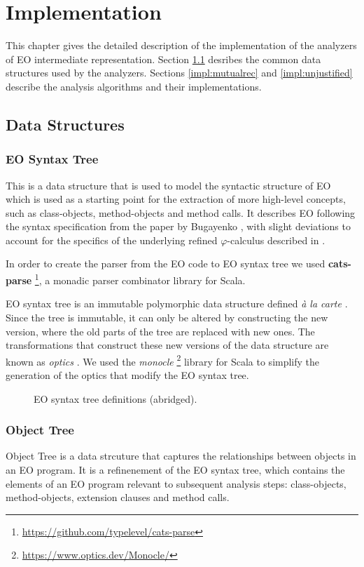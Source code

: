 \chapter{Implementation}
\label{chap:impl}
This chapter gives the detailed description of the implementation of the analyzers of EO intermediate representation. Section \ref{impl:data_structures} desribes the common data structures used by the analyzers. Sections \ref{impl:mutualrec} and \ref{impl:unjustified} describe the analysis algorithms and their implementations.

\section{Data Structures}
\label{impl:data_structures}

\subsection{EO Syntax Tree}
This is a data structure that is used to model the syntactic structure of EO which is used as a starting point for the extraction of more high-level concepts, such as class-objects, method-objects and method calls. It describes EO following the syntax specification from the paper by Bugayenko \cite{eolang}, with slight deviations to account for the specifics of the underlying refined $\varphi$-calculus described in \cite{kudasov}. 

In order to create the parser from the EO code to EO syntax tree we used \textbf{cats-parse} \footnote{\url{https://github.com/typelevel/cats-parse}}, a monadic parser combinator \cite{hill_combinators_1996}  library for Scala.

EO syntax tree is an immutable polymorphic data structure defined \textit{à la carte} \cite{alacarte} . 
Since the tree is immutable, it can only be altered by constructing the new version, where the old parts of the tree are replaced with new ones. The transformations that construct these new versions of the data structure are known as \textit{optics} \cite{optics}. We used the \textit{monocle} \footnote{\url{https://www.optics.dev/Monocle/}} library for Scala to simplify the generation of the optics that modify the EO syntax tree.  

\begin{figure}
    
    \caption{EO syntax tree definitions (abridged).}
    \label{fig:ast}
\end{figure}
\subsection{Object Tree}
Object Tree is a data strcuture that captures the relationships between objects in an EO program. It is a refinenement of the EO syntax tree, which contains the elements of an EO program relevant to subsequent analysis steps: class-objects, method-objects, extension clauses and method calls. 

